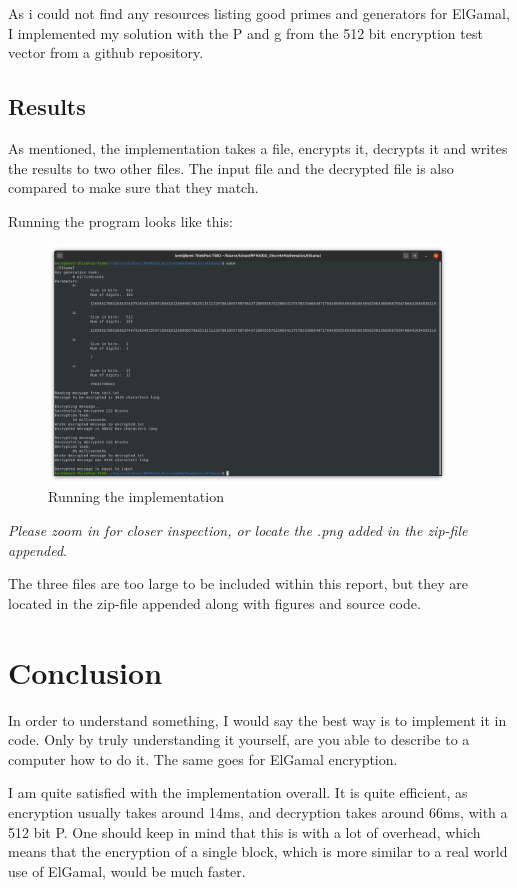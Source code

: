 \documentclass{article}
\begin{document}
As i could not find any resources listing good primes and generators for ElGamal, I implemented my solution with the P and g from the 512 bit encryption test vector from a github repository\cite{PG}.
\subsection{Results}

As mentioned, the implementation takes a file, encrypts it, decrypts it and writes the results to two other files. The input file and the decrypted file is also compared to make sure that they match.

Running the program looks like this:

\begin{figure}[H]
 \centering
  \includegraphics[width=300pt]{img/make.png}
 \caption{Running the implementation}
 \label{MAKE}
 \end{figure}
\textit{Please zoom in for closer inspection, or locate the .png added in the zip-file appended}.


The three files are too large to be included within this report, but they are located in the zip-file appended along with figures and source code.

\section{Conclusion}
In order to understand something, I would say the best way is to implement it in code. Only by truly understanding it yourself, are you able to describe to a computer how to do it. The same goes for ElGamal encryption.

I am quite satisfied with the implementation overall. It is quite efficient, as encryption usually takes around 14ms, and decryption takes around 66ms, with a 512 bit P. One should keep in mind that this is with a lot of overhead, which means that the encryption of a single block, which is more similar to a real world use of ElGamal, would be much faster.
\end{document}
